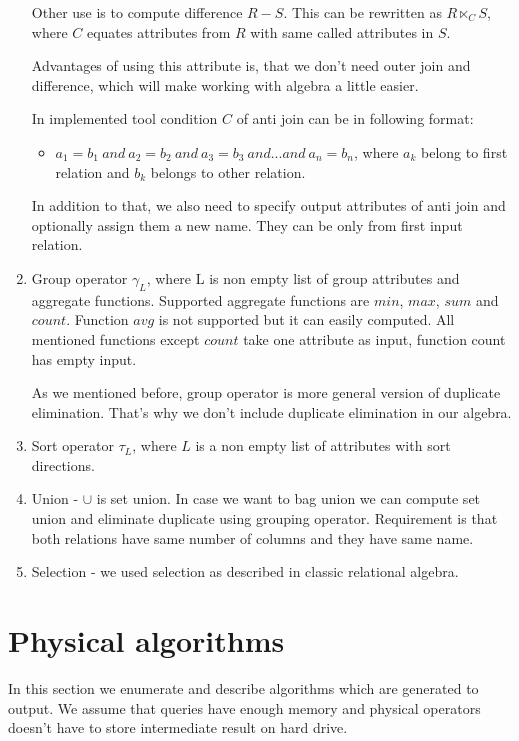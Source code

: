 \begin{enumerate}
Other use is to compute difference $R-S$. This can be rewritten as $R \ltimes_C S$, where $C$ equates attributes from $R$ with same called attributes in $S$. 
 
Advantages of using this attribute is, that we don't need outer join and difference, which will make working with algebra a little easier.

In implemented tool condition $C$ of anti join can be in following format:
\begin{itemize}
\item $a_1=b_1~and~a_2=b_2~and~a_3=b_3~and...and~a_n=b_n$, where $a_k$ belong to first relation and $b_k$ belongs to other relation.
\end{itemize}
In addition to that, we also need to specify output attributes of anti join and optionally assign them a new name. They can be only from first input relation.
\item Group operator $\gamma_L$, where L is non empty list of group attributes and aggregate functions. Supported aggregate functions are $min$, $max$, $sum$ and $count$. Function $avg$ is not supported but it can easily computed. All mentioned functions except $count$ take one attribute as input, function count has empty input. 

As we mentioned before, group operator is more general version of duplicate elimination. That's why we don't include duplicate elimination in our algebra.
\item Sort operator $\tau_L$, where $L$ is a non empty list of attributes with sort directions.
\item Union - $\cup$ is set union. In case we want to bag union we can compute set union and eliminate duplicate using grouping operator. Requirement is that both relations have same number of columns and they have same name.
\item Selection - we used selection as described in classic relational algebra.

\end{enumerate}

\section{Physical algorithms}

In this section we enumerate and describe algorithms which are generated to output. We assume that queries have enough memory and physical operators doesn't have to store intermediate result on hard drive.

